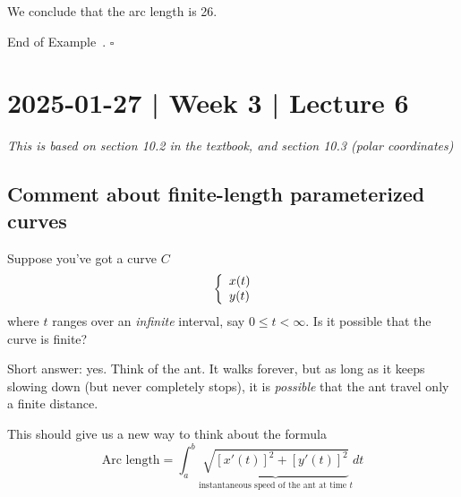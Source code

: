 \documentclass[10pt]{article}
\theoremstyle{definition}
\newtheorem{example}[theorem]{Example}
\renewenvironment{example}
{\begin{oldexample}}
  {\par\smallskip\hfill   End of Example~\theexample. $\square$    \par\end{oldexample}}
\newcommand{\1}[1]{\textbf{1}_{\left[#1\right]}} %
\begin{document}
\begin{max-comment}
\begin{example}[Arc length]
  We conclude that the arc length is 26.
\end{example}

\begin{center}
\end{center}
\end{max-comment}
\newpage
\section{2025-01-27 | Week 3 | Lecture 6}

\textit{This is based on section 10.2 in the textbook, and section 10.3 (polar coordinates)}
\subsection{Comment about finite-length parameterized curves}

Suppose you've got a curve $C$
\begin{equation*}
  \left\{ \begin{array}{l@{}l} x(t) \\ y(t)  \end{array}\right.
\end{equation*}
where $t$ ranges over an \textit{infinite} interval, say $0 \leq t<\infty$. Is it possible that the curve
is finite?

Short answer: yes. Think of the ant. It walks forever, but as long as it keeps slowing down (but never
completely stops), it is \textit{possible} that the ant travel only a finite distance.

This should give us a new way to think about the formula
\begin{equation*}
  \text{Arc length}  = \int_{a}^{b}\underbrace{\sqrt{\left[ x'(t) \right]^{2} + \left[ y'(t) \right]^{2}
    }}_{\text{instantaneous speed of the ant at time $t$}}dt 
\end{equation*}
\end{document}
